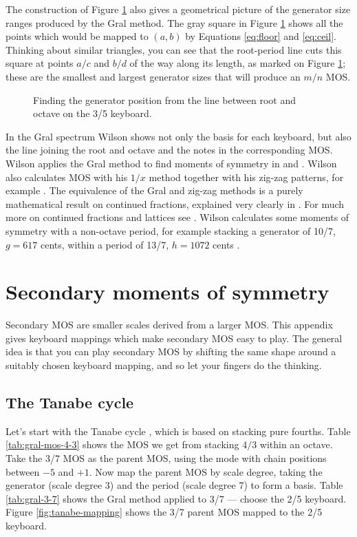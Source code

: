 \documentclass[a4paper,11pt]{article}
\begin{document}
The construction of Figure \ref{fig:as-above-so-below} also gives a geometrical
picture of the generator size ranges produced by the Gral method. The gray
square in Figure \ref{fig:as-above-so-below} shows all the points which would
be mapped to $(a, b)$ by Equations \ref{eq:floor} and \ref{eq:ceil}. Thinking
about similar triangles, you can see that the root-period line cuts this square
at points $a/c$ and $b/d$ of the way along its length, as marked on Figure
\ref{fig:as-above-so-below}; these are the smallest and largest generator sizes
that will produce an $m/n$ MOS.

\begin{figure}
\centering

\caption{Finding the generator position from the line between root and octave
on the 3/5 keyboard.}
\label{fig:as-above-so-below}
\end{figure}

In the Gral spectrum \cite{wilsongralspectrum} Wilson shows not only the basis
for each keyboard, but also the line joining the root and octave and the notes
in the corresponding MOS. Wilson applies the Gral method to find moments of
symmetry in \cite[14-47]{wilsondiophantinetemper} and
\cite{wilsondiophantinerecur}.  Wilson also calculates MOS with his $1/x$
method together with his zig-zag patterns, for example
\cite[3]{wilsondiophantinerecur}. The equivalence of the Gral and zig-zag
methods is a purely mathematical result on continued fractions, explained very
clearly in \cite{richards1981continued}. For much more on continued fractions
and lattices see \cite{karpenkov2022geometry}. Wilson calculates some moments
of symmetry with a non-octave period, for example stacking a generator of 10/7,
$g = 617$ cents, within a period of 13/7, $h = 1072$ cents
\cite[7]{wilsonnonoctave}.

\clearpage
\section{Secondary moments of symmetry}
Secondary MOS are smaller scales derived from a larger MOS. This appendix gives
keyboard mappings which make secondary MOS easy to play. The general idea is
that you can play secondary MOS by shifting the same shape around a suitably
chosen keyboard mapping, and so let your fingers do the thinking.

\subsection{The Tanabe cycle}
Let's start with the Tanabe cycle \cite[13]{wilsonmos}, which is based on
stacking pure fourths. Table \ref{tab:gral-mos-4-3} shows the MOS we get from
stacking $4/3$ within an octave. Take the 3/7 MOS as the parent MOS, using the
mode with chain positions between $-5$ and $+1$. Now map the parent MOS by
scale degree, taking the generator (scale degree 3) and the period (scale
degree 7) to form a basis. Table \ref{tab:gral-3-7} shows the Gral method
applied to 3/7 --- choose the 2/5 keyboard. Figure \ref{fig:tanabe-mapping}
shows the 3/7 parent MOS mapped to the 2/5 keyboard.
\end{document}
